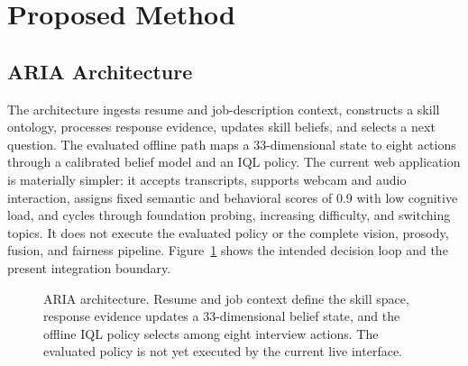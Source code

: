\documentclass[journal]{IEEEtran}
\begin{document}
\section{Proposed Method}


\subsection{ARIA Architecture}

The architecture ingests resume and job-description context, constructs a skill ontology, processes response evidence, updates skill beliefs, and selects a next question. The evaluated offline path maps a 33-dimensional state to eight actions through a calibrated belief model and an IQL policy. The current web application is materially simpler: it accepts transcripts, supports webcam and audio interaction, assigns fixed semantic and behavioral scores of 0.9 with low cognitive load, and cycles through foundation probing, increasing difficulty, and switching topics. It does not execute the evaluated policy or the complete vision, prosody, fusion, and fairness pipeline. Figure~\ref{fig:aria-evidence-boundary} shows the intended decision loop and the present integration boundary.


\begin{figure}[t]
\centering
{}
\caption{ARIA architecture. Resume and job context define the skill space, response evidence updates a 33-dimensional belief state, and the offline IQL policy selects among eight interview actions. The evaluated policy is not yet executed by the current live interface.}
\label{fig:aria-evidence-boundary}
\end{figure}
\end{document}
